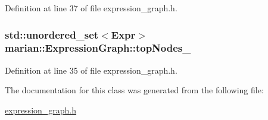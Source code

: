 Definition at line 37 of file expression\+\_\+graph.\+h.

\subsubsection[{\texorpdfstring{top\+Nodes\+\_\+}{topNodes_}}]{\setlength{\rightskip}{0pt plus 5cm}std\+::unordered\+\_\+set$<${\bf Expr}$>$ marian\+::\+Expression\+Graph\+::top\+Nodes\+\_\+\hspace{0.3cm}{\ttfamily [private]}}\hypertarget{classmarian_1_1ExpressionGraph_a9dc6da42eac5ff91816adf1fa170c6e7}{}\label{classmarian_1_1ExpressionGraph_a9dc6da42eac5ff91816adf1fa170c6e7}


Definition at line 35 of file expression\+\_\+graph.\+h.



The documentation for this class was generated from the following file\+:\begin{DoxyCompactItemize}
\item 
\hyperlink{expression__graph_8h}{expression\+\_\+graph.\+h}\end{DoxyCompactItemize}
